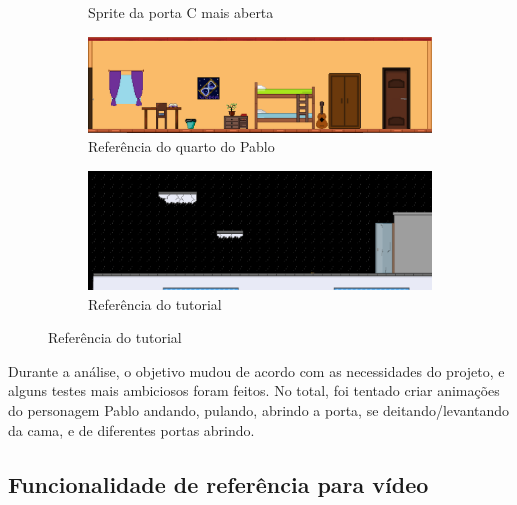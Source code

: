 \begin{figure}[htbp]
\begin{subfigure}{0.18\linewidth}
        \caption{\small Sprite da porta C mais aberta}
        \label{fig:viduPortaC3}
    \end{subfigure}
    \begin{subfigure}{0.45\linewidth}
        \centering
        \includegraphics[width=1\linewidth]{figs/vidu/referencia_quarto.PNG}
        \caption{\small Referência do quarto do Pablo}
        \label{fig:viduQuartoPablo}
    \end{subfigure}
    \begin{subfigure}{0.45\linewidth}
        \centering
        \includegraphics[width=1\linewidth]{figs/vidu/referencia_tutorial.PNG}
        \caption{\small Referência do tutorial}
        \label{fig:viduTutorial}
    \end{subfigure}
\end{figure}

Durante a análise, o objetivo mudou de acordo com as necessidades do projeto, e alguns testes mais ambiciosos foram feitos. No total, foi tentado criar animações do personagem Pablo andando, pulando, abrindo a porta, se deitando/levantando da cama, e de diferentes portas abrindo.

\FloatBarrier
\subsection{Funcionalidade de referência para vídeo}
\label{s.vidu.referencia}




